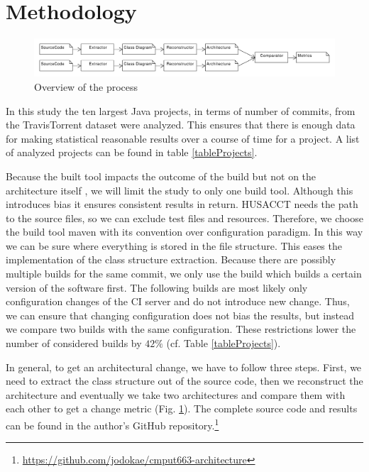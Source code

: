 \documentclass[conference]{IEEEtran}
\begin{document}
\section{Methodology}

\begin{figure}[!t]
	\centering
	\includegraphics[width=7in]{assets/overview.pdf}
	\caption{Overview of the process}
	\label{overview}
\end{figure}



In this study the ten largest Java projects, in terms of number of commits, from the TravisTorrent dataset were analyzed. This ensures that there is enough data for making statistical reasonable results over a course of time for a project. A list of analyzed projects can be found in table \ref{tableProjects}.

Because the built tool impacts the outcome of the build but not on the architecture itself \cite{FailsCorr}, we will limit the study to only one build tool. Although this introduces bias it ensures consistent results in return. HUSACCT needs the path to the source files, so we can exclude test files and resources. Therefore, we choose the build tool maven  with its convention over configuration paradigm. In this way we can be sure where everything is stored in the file structure. This eases the implementation of the class structure extraction. 
Because there are possibly multiple builds for the same commit, we only use the build which builds a certain version of the software first. The following builds are most likely only configuration changes of the CI server and do not introduce new change. Thus, we can ensure that changing configuration does not bias the results, but instead we compare two builds with the same configuration. These restrictions lower the number of considered builds by $42\%$ (cf. Table \ref{tableProjects}). 

In general, to get an architectural change, we have to follow three steps. First, we need to extract the class structure out of the source code, then we reconstruct the architecture and eventually we take two architectures and compare them with each other to get a change metric (Fig. \ref{overview}). The complete source code and results can be found in the author's GitHub repository.\footnote{\url{https://github.com/jodokae/cmput663-architecture}}
\end{document}

